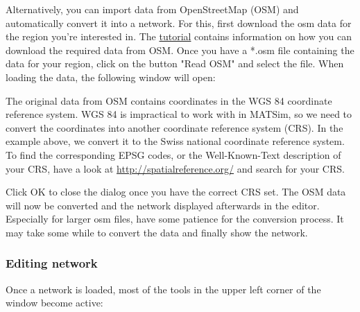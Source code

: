 \documentclass[a4paper,11pt]{report}
\begin{document}
Alternatively, you can import data from OpenStreetMap (OSM) and  automatically convert it into a network. For this, first download the  osm data for the region you're interested in. The \href{http://www.matsim.org/docs/tutorials/8lessons/input/creating/network}{tutorial}  contains information on how you can download the required data from  OSM. Once you have a *.osm file containing the data for your region,  click on the button "Read OSM" and select the file. When loading the  data, the following window will open:



The original data from OSM contains coordinates in the WGS 84  coordinate reference system. WGS 84 is impractical to work with in  MATSim, so we need to convert the coordinates into another coordinate  reference system (CRS). In the example above, we convert it to the Swiss  national coordinate reference system. To find the corresponding EPSG  codes, or the Well-Known-Text description of your CRS, have a look at \href{http://spatialreference.org/}{http://spatialreference.org/} and search for your CRS.

Click OK to close the dialog once you have the correct CRS set. The  OSM data will now be converted and the network displayed afterwards in  the editor. Especially for larger osm files, have some patience for the  conversion process. It may take some while to convert the data and  finally show the network.

\subsubsection{Editing network}

Once a network is loaded, most of the tools in the upper left corner of the window become active:


\end{document}
